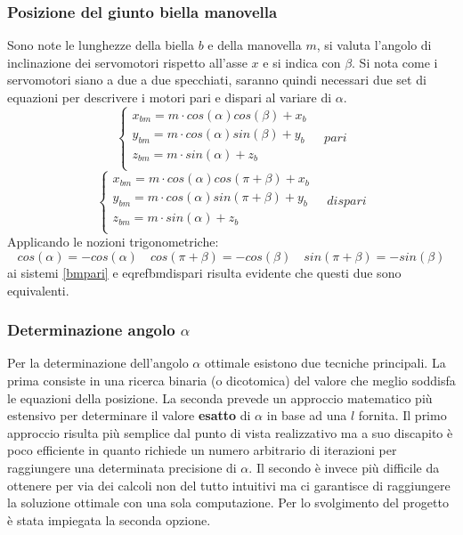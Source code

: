 \documentclass[11pt]{article}
\begin{document}
\subsubsection{Posizione del giunto biella manovella}
Sono note le lunghezze della biella $b$ e della manovella $m$, si valuta l'angolo di inclinazione dei servomotori rispetto all'asse $x$ e si indica con $\beta$. Si nota come i servomotori siano a due a due specchiati, saranno quindi necessari due set di equazioni per descrivere i motori pari e dispari al variare di $\alpha$.
\begin{equation}\label{bmpari}
    \begin{cases}
      x_{bm}=m \cdot cos(\alpha)cos(\beta)+x_b\\
      y_{bm}=m \cdot cos(\alpha)sin(\beta)+y_b\\
      z_{bm}=m \cdot sin(\alpha)+z_b\\
    \end{cases}\quad pari
\end{equation}
\begin{equation}\label{bmdispari}
    \begin{cases}
      x_{bm}=m \cdot cos(\alpha)cos(\pi+\beta)+x_b\\
      y_{bm}=m \cdot cos(\alpha)sin(\pi+\beta)+y_b\\
      z_{bm}=m \cdot sin(\alpha)+z_b\\
    \end{cases}\quad dispari
\end{equation}
Applicando le nozioni trigonometriche: 
$$cos(\alpha)=-cos(\alpha) \quad cos(\pi+\beta)=-cos(\beta) \quad sin(\pi+\beta)=-sin(\beta)$$
ai sistemi \eqref{bmpari} e eqref{bmdispari} risulta evidente che questi due sono equivalenti.
\subsubsection{Determinazione angolo $\alpha$}
Per la determinazione dell'angolo $\alpha$ ottimale esistono due tecniche principali. La prima consiste in una ricerca binaria (o dicotomica) del valore che meglio soddisfa le equazioni della posizione. La seconda prevede un approccio matematico più estensivo per determinare il valore \textbf{esatto} di $\alpha$ in base ad una $l$ fornita. Il primo approccio risulta più semplice dal punto di vista realizzativo ma a suo discapito è poco efficiente in quanto richiede un numero arbitrario di iterazioni per raggiungere una determinata precisione di $\alpha$. Il secondo è invece più difficile da ottenere per via dei calcoli non del tutto intuitivi ma ci garantisce di raggiungere la soluzione ottimale con una sola computazione. Per lo svolgimento del progetto è stata impiegata la seconda opzione.
\end{document}
